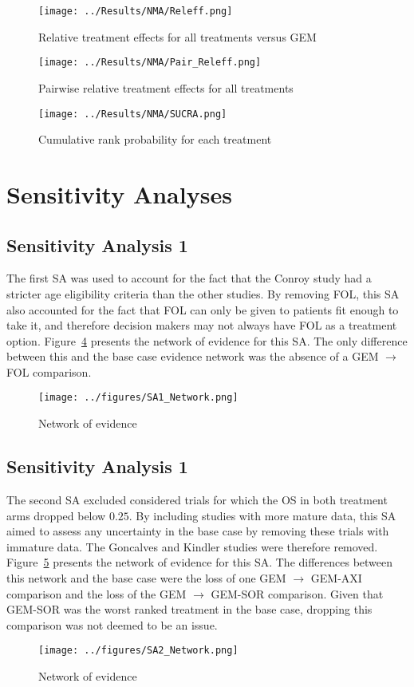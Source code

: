 \begin{figure}[h]
    \centering
    \texttt{[image: ../Results/NMA/Releff.png]}
    \caption{Relative treatment effects for all treatments versus GEM}
    \label{fig:releff}
\end{figure}

\begin{figure}[h]
    \centering
    \texttt{[image: ../Results/NMA/Pair\_Releff.png]}
    \caption{Pairwise relative treatment effects for all treatments}
    \label{fig:pair_releff}
\end{figure}

\begin{figure}[h]
    \centering
    \texttt{[image: ../Results/NMA/SUCRA.png]}
    \caption{Cumulative rank probability for each treatment}
    \label{fig:sucra}
\end{figure}

\newpage
\section{Sensitivity Analyses}

\subsection{Sensitivity Analysis 1}
The first SA was used to account for the fact that the Conroy study had a stricter age eligibility criteria than the other studies. By removing FOL, this SA also accounted for the fact that FOL can only be given to patients fit enough to take it, and therefore decision makers may not always have FOL as a treatment option. Figure~\ref{fig:sa1net} presents the network of evidence for this SA. The only difference between this and the base case evidence network was the absence of a GEM $\rightarrow$ FOL comparison.

\begin{figure}[h]
    \centering
    \texttt{[image: ../figures/SA1\_Network.png]}
    \caption{Network of evidence}
    \label{fig:sa1net}
\end{figure}

\subsection{Sensitivity Analysis 1}
The second SA excluded considered trials for which the OS in both treatment arms dropped below $0.25$. By including studies with more mature data, this SA aimed to assess any uncertainty in the base case by removing these trials with immature data. The Goncalves and Kindler studies were therefore removed. Figure~\ref{fig:sa2net} presents the network of evidence for this SA. The differences between this network and the base case were the loss of one GEM $\rightarrow$ GEM-AXI comparison and the loss of the GEM $\rightarrow$ GEM-SOR comparison. Given that GEM-SOR was the worst ranked treatment in the base case, dropping this comparison was not deemed to be an issue.

\begin{figure}[h]
    \centering
    \texttt{[image: ../figures/SA2\_Network.png]}
    \caption{Network of evidence}
    \label{fig:sa2net}
\end{figure}
